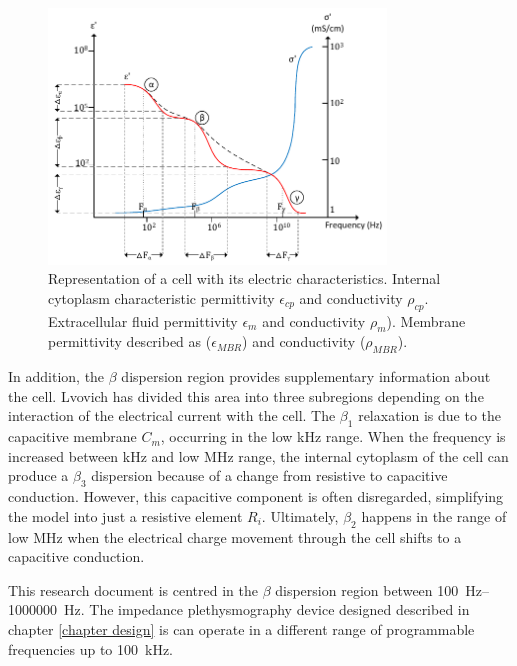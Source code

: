 \begin{figure}[!htpb]
	\centering
	\includegraphics[width=0.8\textwidth,keepaspectratio, trim={0cm 1cm 0cm 0cm},clip]{figure3}    
	\caption[Alpha, Bet y Gama dispersion]{Representation of a cell with its electric characteristics. Internal cytoplasm characteristic permittivity $\epsilon_{cp}$ and conductivity $\rho_{cp}$. Extracellular fluid permittivity $\epsilon_m$ and conductivity $\rho_m$). Membrane permittivity described as ($\epsilon_{MBR}$) and conductivity ($\rho_{MBR}$).}
	\label{fig:ABG dispersion}
\end{figure}

In addition, the $\beta$ dispersion region provides supplementary information about the cell. Lvovich \cite{lvovich2012impedance} has divided this area into three subregions depending on the interaction of the electrical current with the cell. The $\beta_1$ relaxation is due to the capacitive membrane $C_m$, occurring in the low \si{\kilo\hertz} range. When the frequency is increased between \si{\kilo\hertz} and low \si{\mega\hertz} range, the internal cytoplasm of the cell can produce a $\beta_3$ dispersion because of a change from resistive to capacitive conduction. However, this capacitive component is often disregarded, simplifying the model into just a resistive element $R_i$. Ultimately, $\beta_2$ happens in the range of low \si{\mega\hertz} when the electrical charge movement through the cell shifts to a capacitive conduction.

This research document is centred in the $\beta$ dispersion region between \SIrange[scientific-notation = engineering]{100}{1000000}{\hertz}. The impedance plethysmography device designed described in chapter \ref{chapter design} is can operate in a different range of programmable frequencies up to \SI{100}{\kHz}. 

